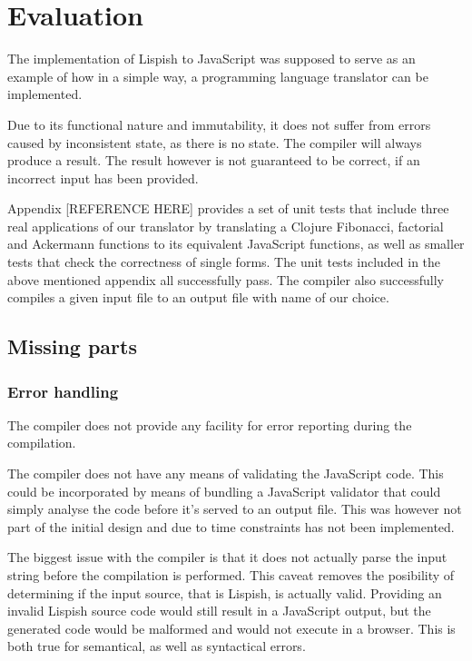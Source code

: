 \chapter{Evaluation}
The implementation of Lispish to JavaScript was supposed to serve as an example of how in a simple way, a programming language translator can be implemented.

Due to its functional nature and immutability, it does not suffer from errors caused by inconsistent state, as there is no state. The compiler will always produce a result. The result however is not guaranteed to be correct, if an incorrect input has been provided. 

Appendix [REFERENCE HERE] provides a set of unit tests that include three real applications of our translator by translating a Clojure Fibonacci, factorial and Ackermann functions to its equivalent JavaScript functions, as well as smaller tests that check the correctness of single forms.
The unit tests included in the above mentioned appendix all successfully pass.
The compiler also successfully compiles a given input file to an output file with name of our choice. 

\section{Missing parts}
\subsection{Error handling}
The compiler does not provide any facility for error reporting during the compilation.

The compiler does not have any means of validating the JavaScript code. This could be incorporated by means of bundling a JavaScript validator that could simply analyse the code before it's served to an output file. This was however not part of the initial design and due to time constraints has not been implemented.

The biggest issue with the compiler is that it does not actually parse the input string before the compilation is performed. This caveat removes the posibility of determining if the input source, that is Lispish, is actually valid. 
Providing an invalid Lispish source code would still result in a JavaScript output, but the generated code would be malformed and would not execute in a browser. This is both true for semantical, as well as syntactical errors.